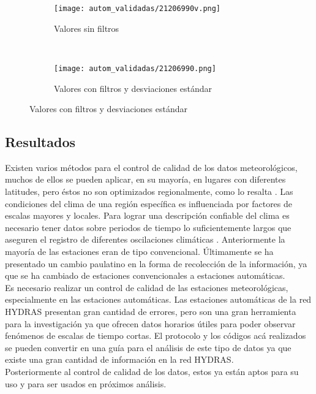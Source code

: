 \begin{figure}[H]
	\begin{subfigure}[b]{0.5\textwidth}
	\begin{center}
	\caption{Valores sin filtros}
    \texttt{[image: autom\_validadas/21206990v.png]}

	
	\label{subfig:c1}
		\end{center}
	\end{subfigure}
	~
		\begin{subfigure}[b]{0.5\textwidth}
	\begin{center}
    \caption{Valores con filtros y desviaciones estándar}
		\texttt{[image: autom\_validadas/21206990.png]}

	
	\label{subfig:c2}
	\end{center}	
	\end{subfigure}
	
	
	
\end{figure}
\subsection{Resultados}


Existen varios métodos para el control de calidad de los datos meteorológicos, muchos de ellos se pueden aplicar, en su mayoría, en lugares con diferentes latitudes, pero éstos no son optimizados regionalmente, como lo resalta \citet{espinar2012controlling}. Las condiciones del clima de una región específica es influenciada por factores de escalas mayores y locales. Para lograr una descripción confiable del clima es necesario tener datos sobre periodos de tiempo lo suficientemente largos que aseguren el registro de diferentes oscilaciones climáticas \citep{kaspar2016climate}. Anteriormente la mayoría de las estaciones eran de tipo convencional. Últimamente se ha presentado un cambio paulatino en la forma de recolección de la información, ya que se ha cambiado de estaciones convencionales a estaciones automáticas.\\

Es necesario realizar un control de calidad de las estaciones meteorológicas, especialmente en las estaciones automáticas. Las estaciones automáticas de la red HYDRAS presentan gran cantidad de errores, pero son una gran herramienta para la investigación ya que ofrecen datos horarios útiles para poder observar fenómenos de escalas de tiempo cortas. El protocolo y los códigos acá realizados se pueden convertir en una guía para el análisis de este tipo de datos ya que existe una gran cantidad de información en la red HYDRAS.\\

Posteriormente al control de calidad de los datos, estos ya están aptos para su uso y para ser usados en próximos análisis.
